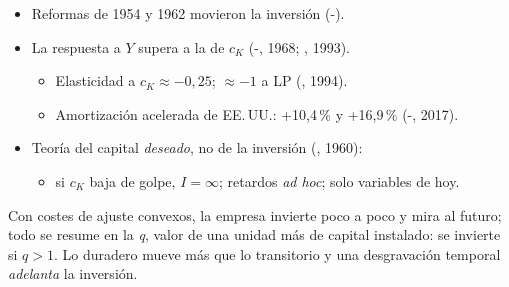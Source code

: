 \documentclass{article}
\begin{document}
\begin{columnas}
\begin{itemize}
\item Reformas de 1954 y 1962 movieron la inversión (-).
\item La respuesta a $Y$ supera a la de $c_K$ (-, 1968; , 1993).
  \begin{itemize}
  \item Elasticidad a $c_K\approx-0{,}25$; $\approx-1$ a LP (, 1994).
  \item Amortización acelerada de EE.\,UU.: +10,4\,\% y +16,9\,\% (-, 2017).
  \end{itemize}
\end{itemize}
\begin{itemize}
\item Teoría del capital \emph{deseado}, no de la inversión (, 1960):
  \begin{itemize}
  \item si $c_K$ baja de golpe, $I=\infty$; retardos \emph{ad hoc}; solo variables de hoy.
  \end{itemize}
\end{itemize}

\begin{ideaclave}
Con costes de ajuste convexos, la empresa invierte poco a poco y mira al futuro; todo se resume en la \emph{q}, valor de una unidad más de capital instalado: se invierte si $q>1$. Lo duradero mueve más que lo transitorio y una desgravación temporal \emph{adelanta} la inversión.
\end{ideaclave}


\end{columnas}
\end{document}
